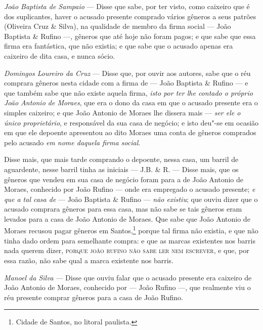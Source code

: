 \noindent\emph{João Baptista de Sampaio} --- Disse que sabe, por ter visto, como
caixeiro que é dos suplicantes, haver o acusado presente comprado vários
gêneros a seus patrões (Oliveira Cruz \& Silva), na qualidade de membro
da firma social --- João Baptista \& Rufino ---, gêneros que até hoje
não foram pagos; e que sabe que essa firma era fantástica, que não
existia; e que sabe que o acusado apenas era caixeiro de dita casa, e
nunca sócio.\medskip

\noindent\emph{Domingos Loureiro da Cruz} --- Disse que, por ouvir aos autores,
sabe que o réu comprara gêneros nesta cidade com a firma de --- João
Baptista \& Rufino --- e que também sabe que não existe aquela firma,
\emph{isto por ter lhe contado o próprio João Antonio de Moraes}, que
era o dono da casa em que o acusado presente era o simples caixeiro; e
que João Antonio de Moraes lhe dissera mais --- \emph{ser ele o único
proprietário}, e responsável da sua casa de negócio; e isto deu"-se em
ocasião em que ele depoente apresentou ao dito Moraes uma conta de
gêneros comprados pelo acusado \emph{em nome daquela firma social}.

Disse mais, que mais tarde comprando o depoente, nessa casa, um barril
de aguardente, nesse barril tinha as iniciais --- J.B. \& R. --- Disse
mais, que os gêneros que vendeu em sua casa de negócio foram para a de
João Antonio de Moraes, conhecido por João Rufino --- onde era
empregado o acusado presente; \emph{e que a tal casa de} --- João Baptista
\& Rufino --- \emph{não existiu}; que ouviu dizer que o acusado
comprara gêneros para essa casa, mas não sabe se tais gêneros eram
levados para a casa de João Antonio de Moraes. Que sabe que João Antonio
de Moraes recusou pagar gêneros em Santos,\footnote{Cidade de Santos,
  no litoral paulista.} porque tal firma não existia, e que não tinha
dado ordem para semelhante compra: e que as marcas existentes nos barris
nada querem dizer, \textsc{porque joão rufino não sabe ler nem escrever}, e que,
por essa razão, não sabe qual a marca existente nos barris.\medskip

\noindent\emph{Manoel da Silva} --- Disse que ouviu falar que o acusado presente
era caixeiro de João Antonio de Moraes, conhecido por --- João Rufino
---, que realmente viu o réu presente comprar gêneros para a casa de
João Rufino.\medskip

